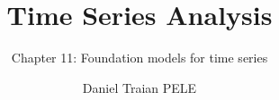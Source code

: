 \title[Time Series Analysis]{Time Series Analysis}
\subtitle{Chapter 11: Foundation models for time series}
\author[D.T. Pele]{Daniel Traian PELE}
\date{}

\providecommand{\tsaapplink}[3]{\hypertarget{#2}{}\hyperlink{#1}{\beamergotobutton{#3}}}  %
\providecommand{\tsaappback}[2]{\begin{tikzpicture}[remember picture,overlay]\node[anchor=south east] at ([xshift=-3mm,yshift=7mm]current page.south east){\hyperlink{#1}{\beamerreturnbutton{#2}}};\end{tikzpicture}}  %
\providecommand{\tsachlink}[2]{\href{#1}{#2}}  %
\providecommand{\tsachlinkt}[2]{\href{#1}{\usebeamercolor[fg]{frametitle}#2}}  %


